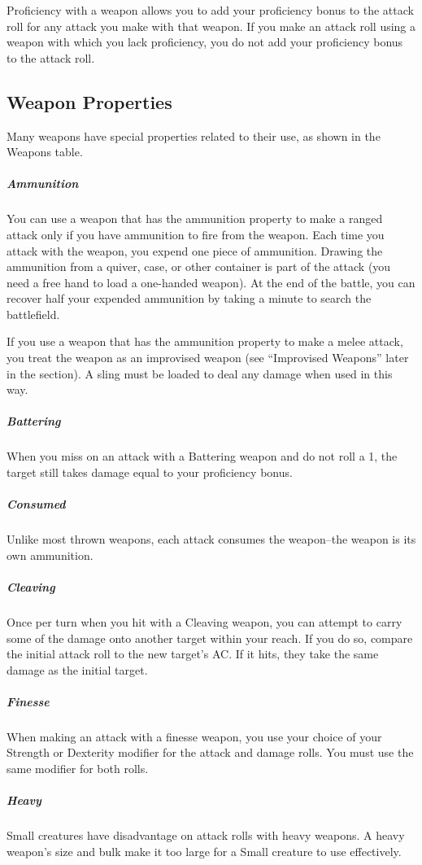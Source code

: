 Proficiency with a weapon allows you to add your proficiency bonus to the attack roll for any attack you make with that weapon. If you make an attack roll using a weapon with which you lack proficiency, you do not add your proficiency bonus to the attack roll.

\subsection{Weapon Properties}

Many weapons have special properties related to their use, as shown in the Weapons table.

\subparagraph*{Ammunition} You can use a weapon that has the ammunition property to make a ranged attack only if you have ammunition to fire from the weapon. Each time you attack with the weapon, you expend one piece of ammunition. Drawing the ammunition from a quiver, case, or other container is part of the attack (you need a free hand to load a one-handed weapon). At the end of the battle, you can recover half your expended ammunition by taking a minute to search the battlefield.

If you use a weapon that has the ammunition property to make a melee attack, you treat the weapon as an improvised weapon (see “Improvised Weapons” later in the section). A sling must be loaded to deal any damage when used in this way.

\subparagraph*{Battering} When you miss on an attack with a Battering weapon and do not roll a 1, the target still takes damage equal to your proficiency bonus.

\subparagraph*{Consumed} Unlike most thrown weapons, each attack consumes the weapon--the weapon is its own ammunition.

\subparagraph*{Cleaving} Once per turn when you hit with a Cleaving weapon, you can attempt to carry some of the damage onto another target within your reach. If you do so, compare the initial attack roll to the new target's AC. If it hits, they take the same damage as the initial target.

\subparagraph*{Finesse} When making an attack with a finesse weapon, you use your choice of your Strength or Dexterity modifier for the attack and damage rolls. You must use the same modifier for both rolls.

\subparagraph*{Heavy} Small creatures have disadvantage on attack rolls with heavy weapons. A heavy weapon's size and bulk make it too large for a Small creature to use effectively. 

